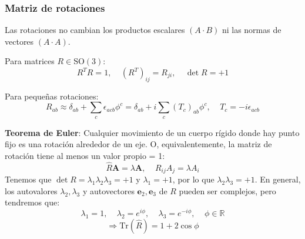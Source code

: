 \documentclass[]{article}
\numberwithin{equation}{section}
\begin{document}
\subsubsection{Matriz de rotaciones}
Las rotaciones no cambian los productos escalares \((A\cdot B)\) ni las normas de vectores \((A\cdot A)\). 

Para matrices \(R\in\mathrm{SO}(3)\):
\begin{equation}
	R^{T}R = 1, ~~~~~ \left(R^{T}\right)_{ij} = R_{ji}, ~~~~~ \det R = +1
\end{equation}

Para pequeñas rotaciones:
\begin{equation}
	R_{ab} \approx \delta_{ab} + \sum_{c}\epsilon_{acb}\phi^{c} = \delta_{ab} + i \sum_{c}\left(T_c\right)_{ab}\phi^{c}, ~~~~~ T_c = -i \epsilon_{acb}
\end{equation}

\textbf{Teorema de Euler}: Cualquier movimiento de un cuerpo rígido donde hay punto fijo es una rotación alrededor de un eje. O, equivalentemente, la matriz de rotación tiene al menos un valor propio = 1:
\begin{equation}
	\hat{R} \mathbf{A} = \lambda \mathbf{A}, ~~~~~ R_{ij}A_{j} = \lambda A_{i}
\end{equation}
Tenemos que \(\det R = \lambda_{1}\lambda_{2}\lambda_{3} = +1\) y \(\lambda_{1} = +1\), por lo que \(\lambda_{2}\lambda_{3} = +1\). En general, los autovalores \(\lambda_{2},\lambda_{3}\) y autovectores \(\mathbf{e}_{2},\mathbf{e}_{3}\) de \(R\) pueden ser complejos, pero tendremos que:
\begin{equation}
	\lambda_{1} = 1, ~~~~~\lambda_{2} = e^{i\phi}, ~~~~~\lambda_{3} = e^{-i\phi}, ~~~~~ \phi\in\mathbb{R}
\end{equation}
\begin{equation}
	\Rightarrow \mathrm{Tr}(\hat{R}) = 1 + 2\cos\phi
\end{equation}
\end{document}
